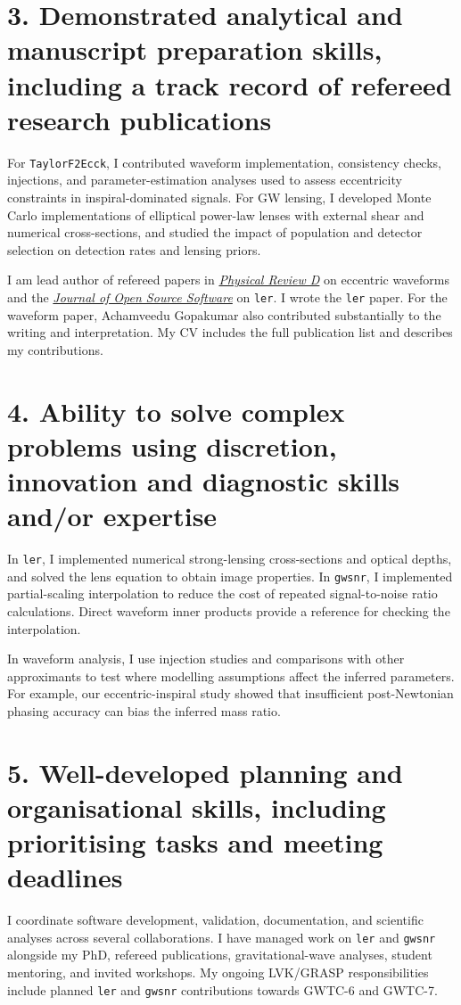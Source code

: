 \documentclass[11pt]{article}
\begin{document}
\section*{3. Demonstrated analytical and manuscript preparation skills, including a track record of refereed research publications}
For \texttt{TaylorF2Ecck}, I contributed waveform implementation, consistency checks, injections, and parameter-estimation analyses used to assess eccentricity constraints in inspiral-dominated signals. For GW lensing, I developed Monte Carlo implementations of elliptical power-law lenses with external shear and numerical cross-sections, and studied the impact of population and detector selection on detection rates and lensing priors.

I am lead author of refereed papers in \href{https://doi.org/10.1103/94fx-wnjx}{\textit{Physical Review D}} on eccentric waveforms and the \href{https://doi.org/10.21105/joss.07420}{\textit{Journal of Open Source Software}} on \texttt{ler}. I wrote the \texttt{ler} paper. For the waveform paper, Achamveedu Gopakumar also contributed substantially to the writing and interpretation. My CV includes the full publication list and describes my contributions.

\section*{4. Ability to solve complex problems using discretion, innovation and diagnostic skills and/or expertise}
In \texttt{ler}, I implemented numerical strong-lensing cross-sections and optical depths, and solved the lens equation to obtain image properties. In \texttt{gwsnr}, I implemented partial-scaling interpolation to reduce the cost of repeated signal-to-noise ratio calculations. Direct waveform inner products provide a reference for checking the interpolation.

In waveform analysis, I use injection studies and comparisons with other approximants to test where modelling assumptions affect the inferred parameters. For example, our eccentric-inspiral study showed that insufficient post-Newtonian phasing accuracy can bias the inferred mass ratio.

\newpage
\section*{5. Well-developed planning and organisational skills, including prioritising tasks and meeting deadlines}
I coordinate software development, validation, documentation, and scientific analyses across several collaborations. I have managed work on \texttt{ler} and \texttt{gwsnr} alongside my PhD, refereed publications, gravitational-wave analyses, student mentoring, and invited workshops. My ongoing LVK/GRASP responsibilities include planned \texttt{ler} and \texttt{gwsnr} contributions towards GWTC-6 and GWTC-7.
\end{document}
